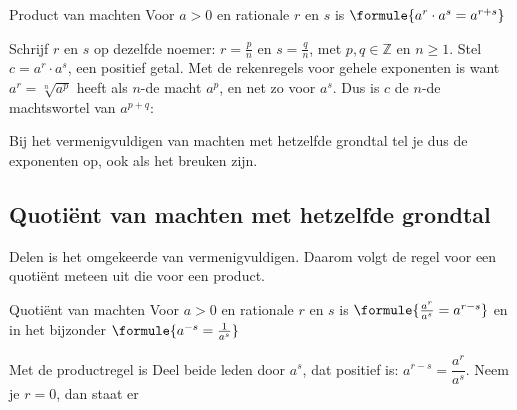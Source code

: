 \begin{theorie}
\begin{stelling}{Product van machten}
Voor $a > 0$ en rationale $r$ en $s$ is \qquad $\formule{a^r \cdot a^s = a^{r + s}}$
\end{stelling}
\begin{bewijs}
Schrijf $r$ en $s$ op dezelfde noemer: $r = \frac{p}{n}$ en $s = \frac{q}{n}$, met $p, q \in \mathbb{Z}$ en $n \geqslant 1$. Stel $c = a^r \cdot a^s$, een positief getal. Met de rekenregels voor gehele exponenten is
want $a^r = \sqrt[n]{a^p}$ heeft als $n$-de macht $a^p$, en net zo voor $a^s$. Dus is $c$ de $n$-de machtswortel van $a^{p+q}$:
\end{bewijs}
\end{theorie}

Bij het vermenigvuldigen van machten met hetzelfde grondtal tel je dus de exponenten op, ook als het breuken zijn.


\begin{oefeningen}
\end{oefeningen}

\subsection{Quotiënt van machten met hetzelfde grondtal}

Delen is het omgekeerde van vermenigvuldigen. Daarom volgt de regel voor een quotiënt meteen uit die voor een product.

\begin{theorie}
\begin{stelling}{Quotiënt van machten}
Voor $a > 0$ en rationale $r$ en $s$ is \qquad $\formule{\frac{a^r}{a^s} = a^{r - s}}$ \qquad en in het bijzonder \qquad $\formule{a^{-s} = \frac{1}{a^s}}$
\end{stelling}
\begin{bewijs}
Met de productregel is
Deel beide leden door $a^s$, dat positief is: $a^{r - s} = \dfrac{a^r}{a^s}$. Neem je $r = 0$, dan staat er
\end{bewijs}
\end{theorie}

